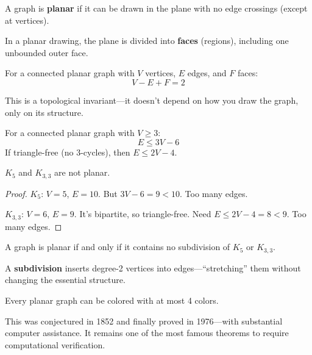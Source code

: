 \begin{definition}
A graph is \textbf{planar} if it can be drawn in the plane with no edge crossings (except at vertices).
\end{definition}

\begin{definition}[Faces]
In a planar drawing, the plane is divided into \textbf{faces} (regions), including one unbounded outer face.
\end{definition}

\begin{theorem}
For a connected planar graph with $V$ vertices, $E$ edges, and $F$ faces:
\[
V - E + F = 2
\]
\end{theorem}

This is a topological invariant---it doesn't depend on how you draw the graph, only on its structure.

\begin{theorem}
For a connected planar graph with $V \geq 3$:
\[
E \leq 3V - 6
\]
If triangle-free (no 3-cycles), then $E \leq 2V - 4$.
\end{theorem}

\begin{corollary}
$K_5$ and $K_{3,3}$ are not planar.
\end{corollary}

\begin{proof}
$K_5$: $V = 5$, $E = 10$. But $3V - 6 = 9 < 10$. Too many edges.

$K_{3,3}$: $V = 6$, $E = 9$. It's bipartite, so triangle-free. Need $E \leq 2V - 4 = 8 < 9$. Too many edges.
\end{proof}

\begin{theorem}
A graph is planar if and only if it contains no subdivision of $K_5$ or $K_{3,3}$.
\end{theorem}

A \textbf{subdivision} inserts degree-2 vertices into edges---``stretching'' them without changing the essential structure.

\begin{theorem}
Every planar graph can be colored with at most 4 colors.
\end{theorem}

This was conjectured in 1852 and finally proved in 1976---with substantial computer assistance. It remains one of the most famous theorems to require computational verification.

